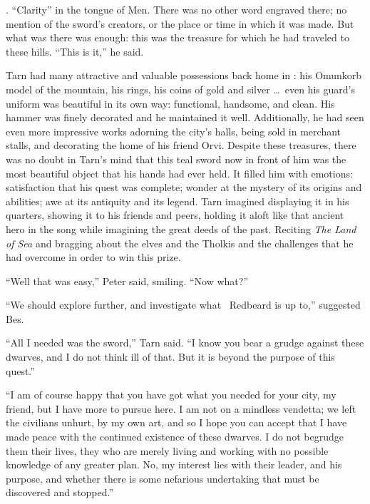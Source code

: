 
\emph{\kildir}.  ``Clarity'' in the tongue of Men.  There was no other word engraved there; no mention of the sword's creators, or the place or time in which it was made.  But what was there was enough: this was the treasure for which he had traveled to these hills.  ``This is it,'' he said.

Tarn had many attractive and valuable possessions back home in \korbarthrond: his Omunkorb model of the mountain, his rings, his coins of gold and silver \ldots\ even his guard's uniform was beautiful in its own way: functional, handsome, and clean.  His hammer was finely decorated and he maintained it well.  Additionally, he had seen even more impressive works adorning the city's halls, being sold in merchant stalls, and decorating the home of his friend Orvi.  Despite these treasures, there was no doubt in Tarn's mind that this teal sword now in front of him was the most beautiful object that his hands had ever held.  It filled him with emotions: satisfaction that his quest was complete; wonder at the mystery of its origins and abilities; awe at its antiquity and its legend.  Tarn imagined displaying it in his quarters, showing it to his friends and peers, holding it aloft like that ancient hero in the song while imagining the great deeds of the past.  Reciting \emph{The Land of Sea} and bragging about the elves and the Tholkis and the challenges that he had overcome in order to win this prize.

``Well that was easy,'' Peter said, smiling.  ``Now what?''

``We should explore further, and investigate what \mothzam\ Redbeard is up to,'' suggested Bes.

``All I needed was the sword,'' Tarn said.  ``I know you bear a grudge against these dwarves, and I do not think ill of that.  But it is beyond the purpose of this quest.''

``I am of course happy that you have got what you needed for your city, my friend, but I have more to pursue here.  I am not on a mindless vendetta; we left the civilians unhurt, by my own art, and so I hope you can accept that I have made peace with the continued existence of these dwarves.  I do not begrudge them their lives, they who are merely living and working with no possible knowledge of any greater plan.  No, my interest lies with their leader, and his purpose, and whether there is some nefarious undertaking that must be discovered and stopped.''

